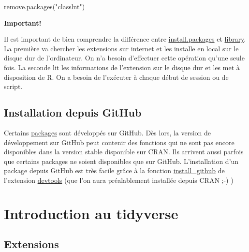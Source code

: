 \documentclass[
]{book}
\newenvironment{Shaded}{\begin{snugshade}}{\end{snugshade}}
\newcommand{\FunctionTok}[1]{\textcolor[rgb]{0.00,0.00,0.00}{#1}}
\newcommand{\NormalTok}[1]{#1}
\newcommand{\StringTok}[1]{\textcolor[rgb]{0.31,0.60,0.02}{#1}}
\begin{document}
\begin{Shaded}
\begin{Highlighting}[]
\FunctionTok{remove.packages}\NormalTok{(}\StringTok{"classlnt"}\NormalTok{)}
\end{Highlighting}
\end{Shaded}

\begin{redbox}

\begin{center}
\textbf{Important!}

\end{center}

Il est important de bien comprendre la différence entre \href{http://rdrr.io/pkg/utils/sym/install.packages}{install.packages} et \href{http://rdrr.io/pkg/utils/sym/install.packages}{library}. La première va chercher les extensions sur internet et les installe en local sur le disque dur de l'ordinateur. On n'a besoin d'effectuer cette opération qu'une seule fois. La seconde lit les informations de l'extension sur le disque dur et les met à disposition de R. On a besoin de l'exécuter à chaque début de session ou de script.

\end{redbox}

\hypertarget{installation-depuis-github}{%
\section{Installation depuis GitHub}\label{installation-depuis-github}}

Certains \href{https://github.com/}{packages} sont développés sur GitHub. Dès lors, la version de développement sur GitHub peut contenir des fonctions qui ne sont pas encore disponibles dans la version stable disponible sur CRAN. Ils arrivent aussi parfois que certains packages ne soient disponibles que sur GitHub.
L'installation d'un package depuis GitHub est très facile grâce à la fonction \href{http://rdrr.io/pkg/devtools/sym/install_github}{install\_github} de l'extension \href{http://rdrr.io/pkg/devtools}{devtools} (que l'on aura préalablement installée depuis CRAN ;-) )

\hypertarget{introduction-au-tidyverse}{%
\chapter{Introduction au tidyverse}\label{introduction-au-tidyverse}}

\hypertarget{extensions}{%
\section{Extensions}\label{extensions}}
\end{document}
